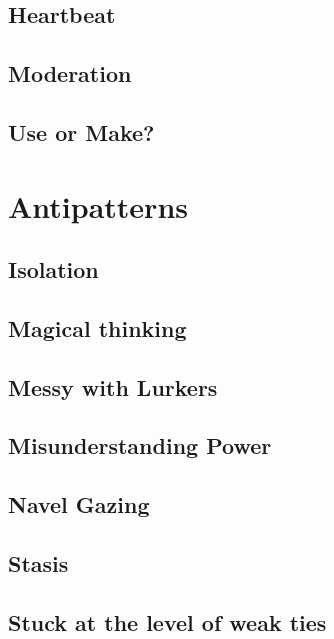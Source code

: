 \documentclass[ebook, 12pt, twoside]{memoir}
\begin{document}
\section*{Heartbeat}

\section*{Moderation}

%
\section*{Use or Make?}



\chapter[\textbf{Antipatterns}]{Antipatterns}

\section*{Isolation}

\section*{Magical thinking}

\section*{Messy with Lurkers}

\section*{Misunderstanding Power}

\section*{Navel Gazing}

\section*{Stasis}

\section*{Stuck at the level of weak ties}

\end{document}
